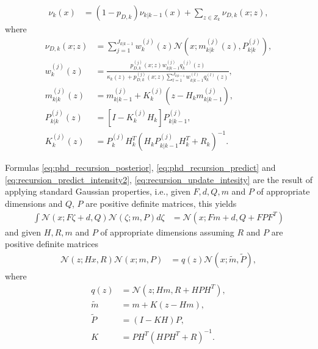 \begin{align}
    \nu_{k}(x) &= (1-p_{D,k}) \nu_{k|k-1}(x) + \sum_{z\in Z_k}\nu_{D,k}(x;z), \label{eq:recursion_update_intesity}
\end{align}
where
\begin{align}
    \nu_{D,k}(x;z) &= \sum_{j=1}^{J_{k|k-1}} w_k^{(j)}(z) \mathcal{N}(x;m_{k|k}^{(j)}(z),P_{k|k}^{(j)}), \label{eq:recursion_update_intesity_detect} \\
    w_k^{(j)}(z) &= \frac{p_{D,k}^{(j)}(x;z) w_{k|k-1}^{(j)} q_k^{(j)}(z) }{\kappa_k(z) + p_{D,k}^{(j)}(x;z) \sum_{l=1}^{J_{k|k-1}} w_{k|k-1}^{(l)} q_k^{(l)}(z)}, \label{eq:recursion_update_intesity_detect_w} \\
    m_{k|k}^{(j)}(z) &= m_{k|k-1}^{(j)} + K_k^{(j)}(z-H_k m_{k|k-1}^{(j)}), \label{eq:recursion_update_intesity_detect_m} \\
    P_{k|k}^{(j)}(z) &= [I - K_k^{(j)} H_k] P_{k|k-1}^{(j)},  \label{eq:recursion_update_intesity_detect_P} \\
    K_{k}^{(j)}(z) &= P_{k}^{(j)} H_k^T(H_k P_{k|k-1}^{(j)} H_k^T + R_k)^{-1}. \label{eq:recursion_update_intesity_detect_K}
\end{align}

Formulas \eqref{eq:phd_recursion_posterior}, \eqref{eq:phd_recursion_predict} and \eqref{eq:recursion_predict_intensity2}, \eqref{eq:recursion_update_intesity} are the result of applying standard Gaussian properties, i.e., given $F, d, Q, m$ and $P$ of appropriate dimensions and $Q$, $P$ are positive definite matrices, this yields
\begin{align}
    \int \mathcal{N}(x; F\zeta + d, Q) \mathcal{N}(\zeta; m, P) d\zeta &= \mathcal{N}(x; Fm + d, Q + FPF^T) \label{eq:phd_integral_Gaussian}
\end{align}
and given $H, R, m$ and $P$ of appropriate dimensions assuming $R$ and $P$ are positive definite matrices
\begin{align}
    \mathcal{N}(z; Hx, R) \mathcal{N}(x;m,P) &= q(z)\mathcal{N}(x; \tilde{m}, \tilde{P}), \label{eq:phd_integral_Gaussian_measurement}
\end{align}
where
\begin{align}
    q(z) &= \mathcal{N}(z; Hm, R + HPH^T), \\
    \tilde{m} &= m + K(z - Hm), \\
    \tilde{P} &= (I - KH)P, \\
    K &= PH^T(HPH^T + R)^{-1}.
\end{align}


